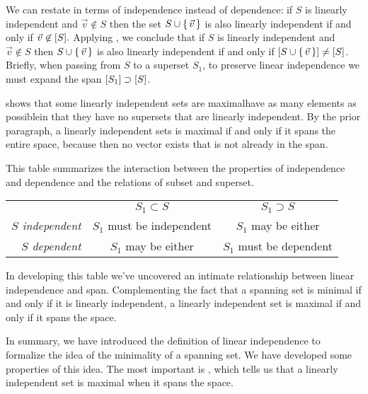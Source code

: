 We can restate 
in terms of independence instead of dependence:
if \( S \) is linearly independent and \( \vec{v}\not\in S \) then
the set \( S\cup\mbox{$\{\,\vec{v}\,\}$} \)
is also linearly independent if and only if \( \vec{v}\not\in\relax [S\relax ]. \)
Applying ,
we conclude that
if \( S \) is linearly independent and \( \vec{v}\not\in S \)
then \( S\cup\mbox{$\{\,\vec{v}\,\}$} \) is also
linearly independent if and only if
\( \relax [S\cup\mbox{$\{\,\vec{v}\,\}$}\relax ]\neq\relax [S\relax ] \).
Briefly,
when passing from $S$ to a superset $S_1$,
to preserve linear independence we must expand the span
$\relax [S_1\relax ]\supset\relax [S\relax ]$.

 shows that some 
linearly independent sets are maximal\Dash have as many elements as 
possible\Dash in
that they have no supersets that are linearly independent.
By the prior paragraph, 
a linearly independent sets is maximal if and only if it
spans the 
entire space, because then no vector exists that is not already in the span.

This table summarizes the interaction between the properties of independence
and dependence and the relations of subset and superset.
\medskip
\begin{center} \renewcommand{\arraystretch}{1.1}
  \begin{tabular}[b]{r|cc} 
                        \multicolumn{1}{c}{}
                        &\multicolumn{1}{c}{\( S_1\subset S \)}
                        &\multicolumn{1}{c}{\( S_1\supset S \)}      \\
     \cline{2-3}\rule{0em}{12pt} %
          \textit{$S$ independent} 
              &\( S_1 \) must be independent   &\( S_1 \) may be either\\
          \textit{$S$ dependent} 
              &\( S_1 \) may be either &\( S_1 \) must be dependent    \\
   \end{tabular}
\end{center}
\medskip
In developing this table we've uncovered an
intimate relationship between linear independence and span.
Complementing the fact that
a spanning set is minimal if and only if it is linearly independent,
a linearly independent set is maximal if and only if it spans the space.

In summary,
we have introduced the definition of linear independence to 
formalize the idea of the minimality of a spanning set.
We have developed some properties of this idea.
The most important is , which 
tells us that a linearly independent set is maximal when it spans the space.


